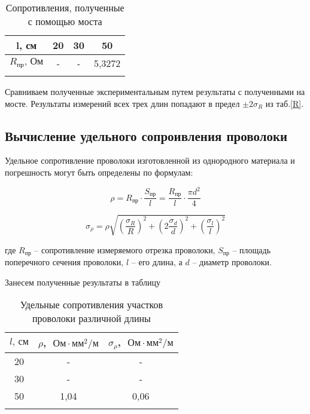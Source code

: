 	\begin{longtable}[H]{|c|c|c|c|}
		\hline
		l, см & 20 & 30 & 50 \\
		\hline
		$R_\text{пр} \text{, Ом}$ & - & - & 5,3272 \\
		\hline
		
		\caption{Сопротивления, полученные с помощью моста}
		\label{most}
	\end{longtable}
	
	Сравниваем полученные экспериментальным путем результаты с полученными на мосте. Результаты измерений всех трех длин попадают в предел $\pm2\sigma_R$ из таб.\ref{R}.
	
	\subsection{Вычисление удельного сопроивления проволоки}
	
	Удельное сопротивление проволоки изготовленной из однородного материала и погрешность могут быть определены по формулам:
	
	\begin{minipage}{0.45\textwidth}
		\centering
		\begin{equation}
			\rho = R_\text{пр}\cdot\frac{S_\text{пр}}{l} = \frac{R_\text{пр}}{l} \cdot \frac{\pi d^2}{4}
		\end{equation}
	\end{minipage}
	\begin{minipage}{0.45\textwidth}
		\centering
		\begin{equation}
			\sigma_\rho = \rho\sqrt{\left(\frac{\sigma_R}{R}\right)^2 + \left( 2\frac{\sigma_d}{d} \right)^2 + \left( \frac{\sigma_l}{l}\right)^2}
		\end{equation}
		
	\end{minipage}
	
	\bigskip
	\noindent где $R_\text{пр}$ -- сопротивление измеряемого отрезка проволоки, $S_\text{пр}$ -- площадь поперечного сечения проволоки, $l$ -- его длина, а $d$ -- диаметр проволоки.
	
	Занесем полученные результаты в таблицу
	\begin{longtable}[H]{|c||c||c|}
		\hline
		$l \text{, см}$ & $\rho$, $  \text{ Ом} \cdot \text{мм}^2 /\text{м}$ & $\sigma_\rho$, $  \text{ Ом} \cdot \text{мм}^2 / \text{м}$\\
		\hline
		20 & - & -\\
		\hline
		30 & - & -\\
		\hline
		50 & 1,04 & 0,06\\
		\hline
		\caption{Удельные сопротивления участков проволоки различной длины}
	\end{longtable}
	
